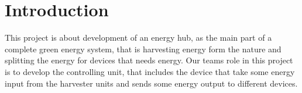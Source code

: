 
\section{Introduction}
This project is about development of an energy hub, as the main part of a complete green energy system, that is harvesting energy form the nature and splitting the energy for devices that needs energy. Our teams role in this project is to develop the controlling unit, that includes the device that take some energy input from the harvester units and sends some energy output to different devices.
\newpage
